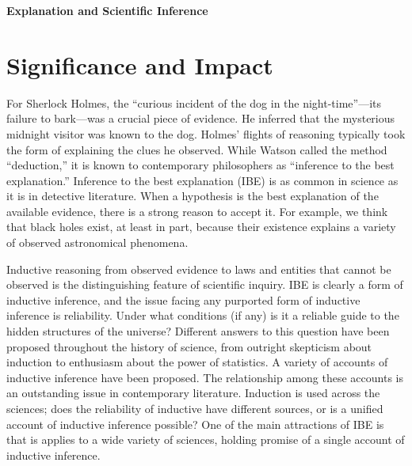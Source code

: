 \documentclass{article}[11pt]
\title{}
\author{}
\date{}
\begin{document}
\doublespacing
\setlength{\parindent}{1cm}
\normalsize

\begin{center}
	\textbf{{\Large Explanation and Scientific Inference}}
\end{center}
\tableofcontents
\clearpage
\section{Significance and Impact}

For Sherlock Holmes, the ``curious incident of the dog in the night-time''---its failure to bark---was a crucial piece of evidence.   He inferred that the mysterious midnight visitor was known to the dog.  Holmes' flights of reasoning typically took the form of explaining the clues he observed.  While Watson called the method ``deduction,'' it is known to contemporary philosophers as ``inference to the best explanation.''  Inference to the best explanation (IBE) is as common in science as it is in detective literature.  When a hypothesis is the best explanation of the available evidence, there is a strong reason to accept it.  For example, we think that black holes exist, at least in part, because their existence explains a variety of observed astronomical phenomena.

Inductive reasoning from observed evidence to laws and entities that cannot be observed is the distinguishing feature of scientific inquiry.  IBE is clearly a form of inductive inference, and the issue facing any purported form of inductive inference is reliability.  Under what conditions (if any) is it a reliable guide to the hidden structures of the universe? Different answers to this question have been proposed throughout the history of science, from outright skepticism about induction to enthusiasm about the power of statistics.  A variety of accounts of inductive inference have been proposed.  The relationship among these accounts is an outstanding issue in contemporary literature.  Induction is used across the sciences; does the reliability of inductive have different sources, or is a unified account of inductive inference possible?  One of the main attractions of IBE is that is applies to a wide variety of sciences, holding promise of a single account of inductive inference.
\end{document}
